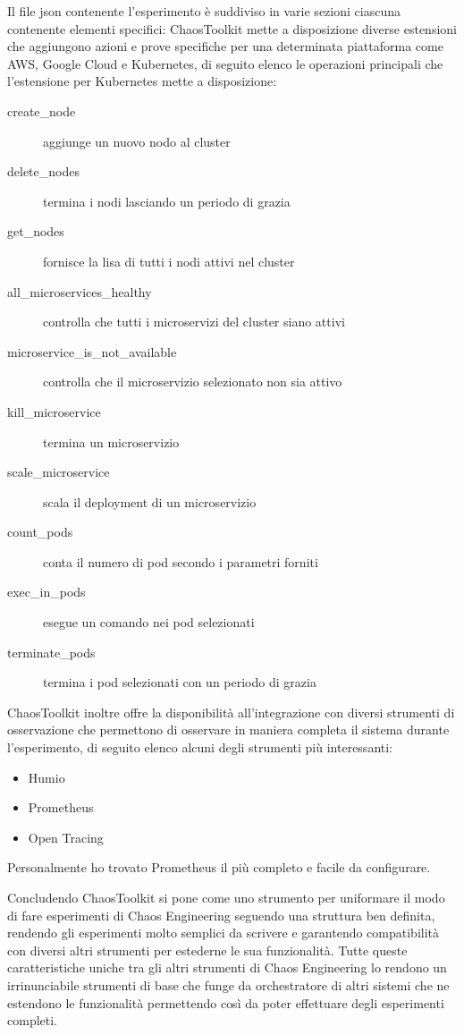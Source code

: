 Il file json contenente l'esperimento è suddiviso in varie sezioni ciascuna contenente elementi specifici:
ChaosToolkit mette a disposizione diverse estensioni che aggiungono azioni e prove specifiche per una determinata piattaforma come AWS, Google Cloud e Kubernetes, di seguito elenco le operazioni principali che l'estensione per Kubernetes mette a disposizione:
\begin{description}
    \item[create\_node] aggiunge un nuovo nodo al cluster
    \item[delete\_nodes] termina i nodi lasciando un periodo di grazia
    \item[get\_nodes] fornisce la lisa di tutti i nodi attivi nel cluster
    \item[all\_microservices\_healthy] controlla che tutti i microservizi del cluster siano attivi
    \item[microservice\_is\_not\_available] controlla che il microservizio selezionato non sia attivo
    \item[kill\_microservice] termina un microservizio
    \item[scale\_microservice] scala il deployment di un microservizio
    \item[count\_pods] conta il numero di pod secondo i parametri forniti
    \item[exec\_in\_pods] esegue un comando nei pod selezionati
    \item[terminate\_pods] termina i pod selezionati con un periodo di grazia 
\end{description}

ChaosToolkit inoltre offre la disponibilità all'integrazione con diversi strumenti di osservazione che permettono di osservare in maniera completa il sistema durante l'esperimento, di seguito elenco alcuni degli strumenti più interessanti:
\begin{itemize}
    \item Humio
    \item Prometheus
    \item Open Tracing
\end{itemize}
Personalmente ho trovato Prometheus il più completo e facile da configurare.

Concludendo ChaosToolkit si pone come uno strumento per uniformare il modo di fare esperimenti di Chaos Engineering seguendo una struttura ben definita, rendendo gli esperimenti molto semplici da scrivere e garantendo compatibilità con diversi altri strumenti per estederne le sua funzionalità.
Tutte queste caratteristiche uniche tra gli altri strumenti di Chaos Engineering lo rendono un irrinunciabile strumenti di base che funge da orchestratore di altri sistemi che ne estendono le funzionalità permettendo così da poter effettuare degli esperimenti completi.
